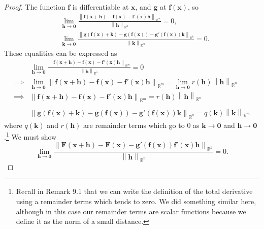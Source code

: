 \documentclass{article}
\newcommand{\R}{\mathbb{R}}
\newcommand{\x}{\mathbf{x}}
\newcommand{\f}{\mathbf{f}}
\newcommand{\h}{\mathbf{h}}
\newcommand{\ze}{\mathbf{0}}
\newcommand{\norm}[1]{\left\lVert#1\right\rVert}
\theoremstyle{definition}
\begin{document}
\begin{proof}
	The function $ \f $ is differentiable at $ \x $, and $ \mathbf g $ at $ \f(\x) $, so 
	\begin{align*}
		&\lim\limits_{\mathbf h\to \ze}\frac{\norm{\f(\x+\mathbf h) - \f(\x)-\f'(\x)\mathbf{h}}_{\R^m}}{\norm{\mathbf h}_{\R^n}} = 0,\\
		&\lim\limits_{\mathbf k\to \ze}\frac{\norm{\mathbf g(\f(\x) + \mathbf k) - \mathbf g(\f(\x))-\mathbf g'(\f(\x))\mathbf{k}}_{\R^k}}{\norm{\mathbf k}_{\R^m}} = 0.
	\end{align*}
These equalities can be expressed as 
\begin{align}
	&\lim\limits_{\mathbf h\to \ze}\frac{\norm{\f(\x+\mathbf h) - \f(\x)-\f'(\x)\mathbf{h}}_{\R^m}}{\norm{\mathbf h}_{\R^n}} = 0 \nonumber\\ 
	\implies& \lim\limits_{\mathbf h\to \ze}\norm{\f(\x+\mathbf h) - \f(\x)-\f'(\x)\mathbf{h}}_{\R^m}= \lim\limits_{\mathbf h\to \ze}r(\h)\norm{\mathbf h}_{\R^n}\nonumber\\
	\implies&  \norm{\f(\x+\mathbf h) - \f(\x)-\f'(\x)\mathbf{h}}_{\R^m}= r(\h)\norm{\mathbf h}_{\R^n}\\\nonumber\\
	&\norm{\mathbf g(\f(\x) + \mathbf k) - \mathbf g(\f(\x))-\mathbf g'(\f(\x))\mathbf{k}}_{\R^k} = q(\mathbf k)\norm{\mathbf k}_{\R^m}
\end{align}
where $ q(\mathbf k) $ and $ r(\h) $ are remainder terms which go to $ 0 $ as $ \mathbf k\to\ze  $ and $ \h\to \ze $.\footnote{Recall in Remark 9.1 that we can write the definition of the total derivative using a remainder terms which tends to zero. We did something similar here, although in this case our remainder terms are scalar functions because we define it as the norm of a small distance.} We must show $$\lim_{\mathbf h\to \ze}	\frac{\norm{\mathbf F(\x + \h) -\mathbf F(\x) - \mathbf g'(\f(\x))\f'(\x)\h}_{\R^k}}{\norm{\h}_{\R^n}} = 0.$$


\end{proof}
\end{document}
